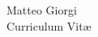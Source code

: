 \documentclass[10pt]{article} %
\begin{document}
\begin{paracol}{2} %


\parbox[top][0.12\textheight][c]{\linewidth}{ %
	\vspace{-0.04\textheight} %
	\centering %
    {\sffamily\Huge Matteo Giorgi}\\
    {\Large\color{headings} Curriculum Vit\ae}
}


%
%
%
%
%
%
%


\end{paracol}
\end{document}
